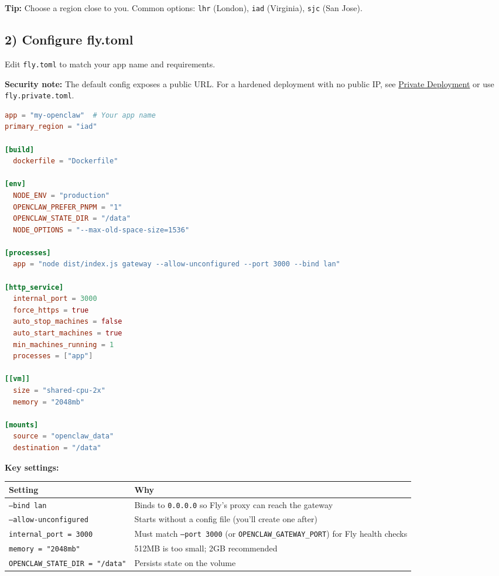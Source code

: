 \textbf{Tip:} Choose a region close to you. Common options: \texttt{lhr} (London), \texttt{iad} (Virginia), \texttt{sjc} (San Jose).

\subsection{2) Configure fly.toml}


Edit \texttt{fly.toml} to match your app name and requirements.

\textbf{Security note:} The default config exposes a public URL. For a hardened deployment with no public IP, see \href{\#private-deployment-hardened}{Private Deployment} or use \texttt{fly.private.toml}.

\begin{lstlisting}[language=toml]
app = "my-openclaw"  # Your app name
primary_region = "iad"

[build]
  dockerfile = "Dockerfile"

[env]
  NODE_ENV = "production"
  OPENCLAW_PREFER_PNPM = "1"
  OPENCLAW_STATE_DIR = "/data"
  NODE_OPTIONS = "--max-old-space-size=1536"

[processes]
  app = "node dist/index.js gateway --allow-unconfigured --port 3000 --bind lan"

[http_service]
  internal_port = 3000
  force_https = true
  auto_stop_machines = false
  auto_start_machines = true
  min_machines_running = 1
  processes = ["app"]

[[vm]]
  size = "shared-cpu-2x"
  memory = "2048mb"

[mounts]
  source = "openclaw_data"
  destination = "/data"
\end{lstlisting}


\textbf{Key settings:}


\begin{table}[h]
\centering
\small
\begin{tabular}{|l|l|}
\hline
Setting & Why \\
\hline
\texttt{--bind lan} & Binds to \texttt{0.0.0.0} so Fly's proxy can reach the gateway \\
\hline
\texttt{--allow-unconfigured} & Starts without a config file (you'll create one after) \\
\hline
\texttt{internal\_port = 3000} & Must match \texttt{--port 3000} (or \texttt{OPENCLAW\_GATEWAY\_PORT}) for Fly health checks \\
\hline
\texttt{memory = "2048mb"} & 512MB is too small; 2GB recommended \\
\hline
\texttt{OPENCLAW\_STATE\_DIR = "/data"} & Persists state on the volume \\
\hline
\end{tabular}
\end{table}



